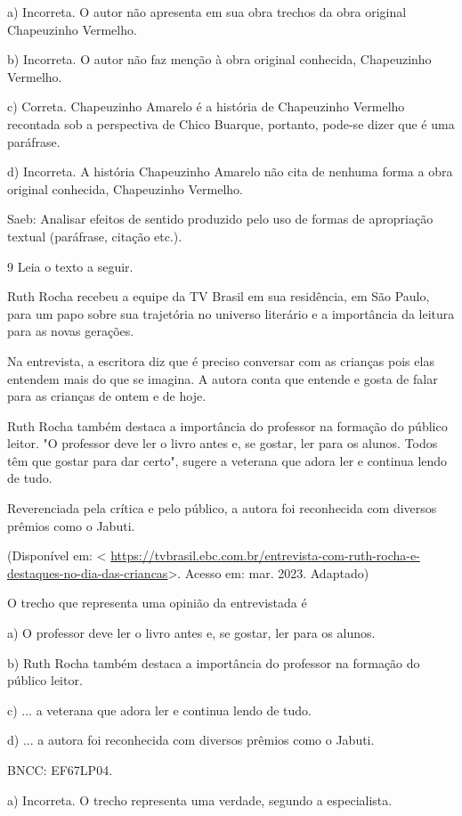 {a) Incorreta. O autor não apresenta em sua obra trechos da obra original
Chapeuzinho Vermelho.

b) Incorreta. O autor não faz menção à obra original conhecida,
Chapeuzinho Vermelho.

c) Correta. Chapeuzinho Amarelo é a história de Chapeuzinho Vermelho
recontada sob a perspectiva de Chico Buarque, portanto, pode-se dizer
que é uma paráfrase.

d) Incorreta. A história Chapeuzinho Amarelo não cita de nenhuma forma a
obra original conhecida, Chapeuzinho Vermelho.

Saeb: Analisar efeitos de sentido produzido pelo uso de formas de
apropriação textual (paráfrase, citação etc.).

\num{9} Leia o texto a seguir.

Ruth Rocha recebeu a equipe da TV Brasil em sua residência, em São
Paulo, para um papo sobre sua trajetória no universo literário e a
importância da leitura para as novas gerações.

Na entrevista, a escritora diz que é preciso conversar com as crianças
pois elas entendem mais do que se imagina. A autora conta que entende e
gosta de falar para as crianças de ontem e de hoje.

Ruth Rocha também destaca a importância do professor na formação do
público leitor. "O professor deve ler o livro antes e, se gostar, ler
para os alunos. Todos têm que gostar para dar certo", sugere a veterana
que adora ler e continua lendo de tudo.

Reverenciada pela crítica e pelo público, a autora foi reconhecida com
diversos prêmios como o Jabuti.

(Disponível em: \textless{}
\url{https://tvbrasil.ebc.com.br/entrevista-com-ruth-rocha-e-destaques-no-dia-das-criancas}\textgreater.
Acesso em: mar. 2023. Adaptado)

O trecho que representa uma opinião da entrevistada é

a) O professor deve ler o livro antes e, se gostar, ler para os alunos.

b) Ruth Rocha também destaca a importância do professor na formação do
público leitor.

c) ... a veterana que adora ler e continua lendo de tudo.

d) ... a autora foi reconhecida com diversos prêmios como o Jabuti.

BNCC: EF67LP04.

a) Incorreta. O trecho representa uma verdade, segundo a especialista.

}
